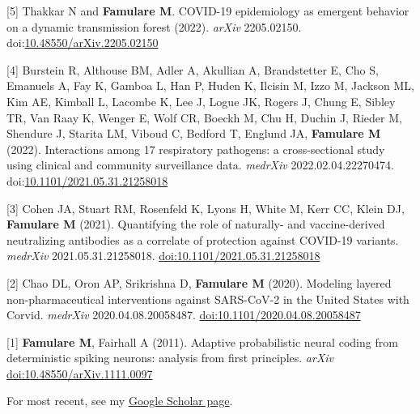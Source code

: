 \documentclass{article}
\begin{document}
\begin{llist}
\begin{items}
\item[{[5]}] Thakkar N and \textbf{Famulare M}. COVID-19 epidemiology as emergent behavior on a dynamic transmission forest (2022). \emph{arXiv} 2205.02150. doi:\href{https://doi.org/10.48550/arXiv.2205.02150}{10.48550/arXiv.2205.02150}

\item[{[4]}] Burstein R, Althouse BM, Adler A, Akullian A, Brandstetter E, Cho S, Emanuels A, Fay K, Gamboa L, Han P, Huden K, Ilcisin M, Izzo M, Jackson ML, Kim AE, Kimball L, Lacombe K, Lee J, Logue JK, Rogers J, Chung E, Sibley TR, Van Raay K, Wenger E, Wolf CR, Boeckh M, Chu H, Duchin J, Rieder M, Shendure J, Starita LM, Viboud C, Bedford T, Englund JA, \textbf{Famulare M} (2022). Interactions among 17 respiratory pathogens: a cross-sectional study using clinical and community surveillance data. \emph{medrXiv} 2022.02.04.22270474. doi:\href{https://doi.org/10.1101/2022.02.04.22270474}{10.1101/2021.05.31.21258018}
	
\item[{[3]}] Cohen JA, Stuart RM, Rosenfeld K, Lyons H, White M, Kerr CC, Klein DJ, \textbf{Famulare M} (2021). Quantifying the role of naturally- and vaccine-derived neutralizing antibodies as a correlate of protection against COVID-19 variants. \emph{medrXiv} 2021.05.31.21258018. \href{https://doi.org/10.1101/2021.05.31.21258018}{doi:10.1101/2021.05.31.21258018}

\item[{[2]}] Chao DL, Oron AP, Srikrishna D, \textbf{Famulare M} (2020). Modeling layered non-pharmaceutical interventions against SARS-CoV-2 in the United States with Corvid. \emph{medrXiv}  2020.04.08.20058487. \href{https://doi.org/10.1101/2020.04.08.20058487}{doi:10.1101/2020.04.08.20058487}

\item[{[1]}] \textbf{Famulare M}, Fairhall A (2011). Adaptive probabilistic neural coding from deterministic spiking neurons: analysis from first principles. \emph{arXiv} \href{https://doi.org/10.48550/arXiv.1111.0097}{doi:10.48550/arXiv.1111.0097}

\end{items}

    
  \vspace{4pt}

\begin{items}

\item[{}] For most recent, see my \href{https://scholar.google.com/citations?hl=en\&user=TPWwr18AAAAJ\&view_op=list_works\&sortby=pubdate}{Google Scholar page}.


\end{items}
\end{llist}
\end{document}
